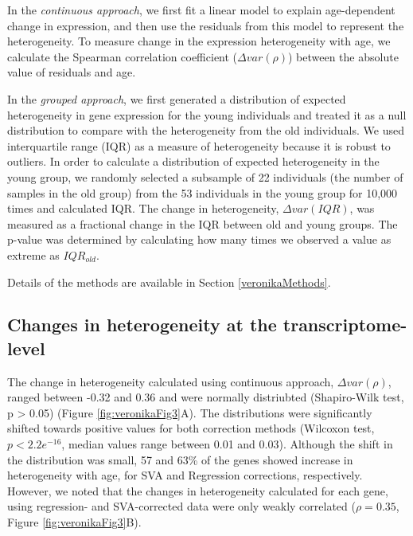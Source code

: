 \documentclass[12pt,twoside]{unicam}
\begin{document}
In the \emph{continuous approach}, we first fit a linear model to explain age-dependent change in expression, and then use the residuals from this model to represent the heterogeneity. To measure change in the expression heterogeneity with age, we calculate the Spearman correlation coefficient (\(\Delta var (\rho)\)) between the absolute value of residuals and age.

In the \emph{grouped approach}, we first generated a distribution of expected heterogeneity in gene expression for the young individuals and treated it as a null distribution to compare with the heterogeneity from the old individuals. We used interquartile range (IQR) as a measure of heterogeneity because it is robust to outliers. In order to calculate a distribution of expected heterogeneity in the young group, we randomly selected a subsample of 22 individuals (the number of samples in the old group) from the 53 individuals in the young group for 10,000 times and calculated IQR. The change in heterogeneity, \(\Delta var(IQR)\), was measured as a fractional change in the IQR between old and young groups. The p-value was determined by calculating how many times we observed a value as extreme as \(IQR_{old}\).

Details of the methods are available in Section \ref{veronikaMethods}.

\hypertarget{changes-in-heterogeneity-at-the-transcriptome-level}{%
\subsection{Changes in heterogeneity at the transcriptome-level}\label{changes-in-heterogeneity-at-the-transcriptome-level}}

The change in heterogeneity calculated using continuous approach, \(\Delta var (\rho)\), ranged between -0.32 and 0.36 and were normally distriubted (Shapiro-Wilk test, p \textgreater{} 0.05) (Figure \ref{fig:veronikaFig3}A). The distributions were significantly shifted towards positive values for both correction methods (Wilcoxon test, \(p<2.2e^{-16}\), median values range between 0.01 and 0.03). Although the shift in the distribution was small, 57 and 63\% of the genes showed increase in heterogeneity with age, for SVA and Regression corrections, respectively. However, we noted that the changes in heterogeneity calculated for each gene, using regression- and SVA-corrected data were only weakly correlated (\(\rho = 0.35\), Figure \ref{fig:veronikaFig3}B).
\end{document}

